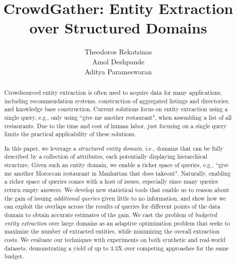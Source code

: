 \documentclass{vldb}
\begin{document}

\title{CrowdGather: Entity Extraction over Structured Domains}


\author{
	\alignauthor Theodoros Rekatsinas\\
            \alignauthor Amol Deshpande\\
            \alignauthor Aditya Parameswaran \\
}

\maketitle

\begin{abstract}
Crowdsourced entity extraction is often used to acquire data for many applications, including recommendation systems, 
construction of aggregated listings and directories, and knowledge base construction. Current solutions focus on entity extraction using a single query, e.g., only using ``give me another restaurant", when assembling a list of all restaurants. Due to the time and cost of human labor, just focusing on a single query limits the practical applicability of these solutions.

In this paper, we leverage a {\em structured entity domain}, i.e., domains that can be fully described by a collection of attributes, each potentially displaying hierarchical structure. Given such an entity domain, we enable a richer space of queries, e.g., ``give me another Moroccan restaurant in Manhattan that does takeout". Naturally, enabling a richer space of queries comes with a host of issues, especially since many queries return empty answers. We develop new statistical tools that enable us to reason about the gain of issuing {\em additional queries} given little to no information, and show how we can exploit the overlaps across the results of queries for different points of the data
domain to obtain accurate estimates of the gain. We cast the problem of {\em budgeted entity extraction} over large domains as an adaptive optimization problem that seeks to maximize the number of extracted entities, while minimizing the overall extraction costs. We evaluate our techniques with experiments on both synthetic and real-world datasets, demonstrating a yield of up to 3.3X over competing approaches for the same budget.
\end{abstract}








\balance

{\small


}
\end{document}
